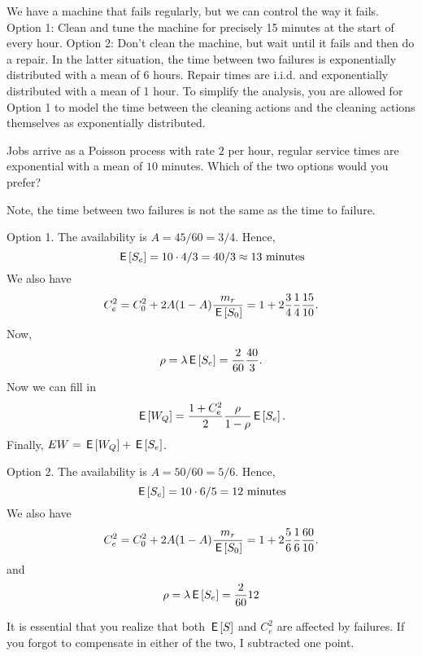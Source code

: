 \begin{exercise}[201706]{2}
  We have a machine that fails regularly, but we can control the way it fails.
  Option 1: Clean and tune the machine for precisely 15 minutes at the start of every hour.
  Option 2: Don't clean the machine, but wait until it fails and then do a repair.
  In the latter situation, the time between two failures is exponentially distributed with a mean of 6 hours.
  Repair times are i.i.d.
  and exponentially distributed with a mean of 1 hour.
  To simplify the analysis, you are allowed for Option 1 to model the time between the cleaning actions and the cleaning actions themselves as exponentially distributed.

Jobs arrive as a Poisson process with rate $2$ per hour, regular service times are exponential with a mean of $10$ minutes. Which of the two options would you prefer?
\begin{solution}
Note, the time between two failures is not the same as the time to failure.


Option 1. The availability is $A=45/60=3/4$. Hence, 
\begin{equation*}
\,\mathsf{E}\left[S_e\right] = 10\cdot 4/3 = 40/3 \approx 13\text{ minutes}
\end{equation*}
We also have
\begin{equation*}
   C_e^2 = C_0^2 + 2A(1-A)\frac{m_r}{\,\mathsf{E}\left[S_0\right]} = 1 + 2\frac{3}{4}\frac1{4}\frac{15}{10}.
 \end{equation*}
Now,
\begin{equation*}
  \rho = \lambda \,\mathsf{E}\left[S_e\right] = \frac{2}{60}\frac{40}3.
\end{equation*}
Now we can fill in 
\begin{equation*}
  \,\mathsf{E}\left[W_Q\right] = \frac{1 + C_e^2}2 \frac{\rho}{1-\rho} \,\mathsf{E}\left[S_e\right].
\end{equation*}
Finally, $E W = \,\mathsf{E}\left[W_Q\right] + \,\mathsf{E}\left[S_e\right]$.


Option 2. The availability is $A=50/60=5/6$. Hence, 
\begin{equation*}
\,\mathsf{E}\left[S_e\right] = 10\cdot 6/5 = 12\text{ minutes}
\end{equation*}
We also have
\begin{equation*}
   C_e^2 = C_0^2 + 2A(1-A)\frac{m_r}{\,\mathsf{E}\left[S_0\right]} = 1 + 2\frac{5}{6}\frac1{6}\frac{60}{10}.
 \end{equation*}
and
\begin{equation*}
  \rho = \lambda \,\mathsf{E}\left[S_e\right] = \frac{2}{60}12
\end{equation*}

It is essential that you realize that both $\,\mathsf{E}\left[S\right]$ and $C_e^2$ are affected by failures. If you forgot to compensate in either of the two, I subtracted one point. 
\end{solution}
\end{exercise}


